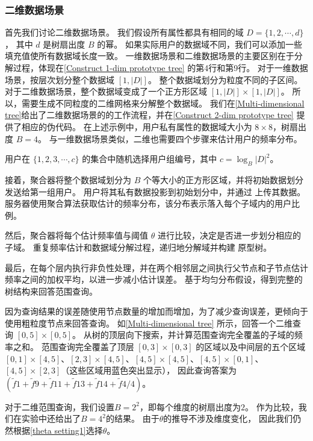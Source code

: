 \subsubsection{二维数据场景}
首先我们讨论二维数据场景。
我们假设所有属性都具有相同的域 $D = \{1, 2, \cdots, d\}$，
其中 $d$ 是树扇出度 $B$ 的幂。
如果实际用户的数据域不同，我们可以添加一些填充值使所有数据域长度一致。
一维数据场景和二维数据场景的主要区别在于分解过程，体现在\autoref{Construct 1-dim prototype tree} 的第4行和第9行。
对于一维数据场景，\myahead 按层次划分整个数据域 $[1, |D|]$。
整个数据域划分为粒度不同的子区间。
对于二维数据场景，整个数据域变成了一个正方形区域 $[1, |D|] \times [1, |D|]$。
所以，\myahead 需要生成不同粒度的二维网格来分解整个数据域。
我们在\autoref{Multi-dimensional tree}给出了二维数据场景的\myahead 的工作流程，并在\autoref{Construct 2-dim prototype tree} 提供了相应的伪代码。
在上述示例中，用户私有属性的数据域大小为 $8\times8$，树扇出度 $B=4$。
与一维数据场景类似，二维\myahead 也需要四个步骤来估计用户的频率分布。

用户在 $\{1, 2, 3, \cdots, c\}$ 的集合中随机选择用户组编号，其中 $c = \log_B|D|^2$。

接着，聚合器将整个数据域划分为 $B$ 个等大小的正方形区域，并将初始数据划分发送给第一组用户。
用户将其私有数据投影到初始划分中，并通过 \oue 上传其数据。
服务器使用聚合算法获取估计的频率分布，该分布表示落入每个子域内的用户比例。

然后，聚合器将每个估计频率值与阈值 $\theta$ 进行比较，决定是否进一步划分相应的子域。
重复频率估计和数据域分解过程，\myahead 递归地分解域并构建 \myahead 原型树。

最后，\myahead 在每个层内执行非负性处理，并在两个相邻层之间执行父节点和子节点估计频率之间的加权平均，以进一步减小估计误差。
基于均匀分布假设，\myahead 得到完整的树结构来回答范围查询。

因为查询结果的误差随使用节点数量的增加而增加，为了减少查询误差，\myahead 更倾向于使用粗粒度节点来回答查询。
如\autoref{Multi-dimensional tree} 所示，\myahead 回答一个二维查询 $[0,5]\times[0,5]$。 
\myahead 从树的顶层向下搜索，并计算范围查询完全覆盖的子域的频率之和。
范围查询完全覆盖了顶层 $[0,3]\times[0,3]$ 的区域以及中间层的五个区域 $[0,1]\times[4,5]$、$[2,3]\times[4,5]$、$[4,5]\times[4,5]$、$[4,5]\times[0,1]$、$[4,5]\times[2,3]$（这些区域用蓝色突出显示），
因此查询答案为 $(\tilde{f}1 + \tilde{f}9 + \tilde{f}{11} + \tilde{f}{13} + \tilde{f}{14} + \tilde{f}{4}/4)$。

对于二维范围查询，我们设置$B=2^2$，即每个维度的树扇出度为$2$。
作为比较，我们在实验中还给出了$B=4^2$的结果。
由于$\theta$的推导不涉及维度变化，
因此我们仍然根据\autoref{theta setting1}选择$\theta$。

